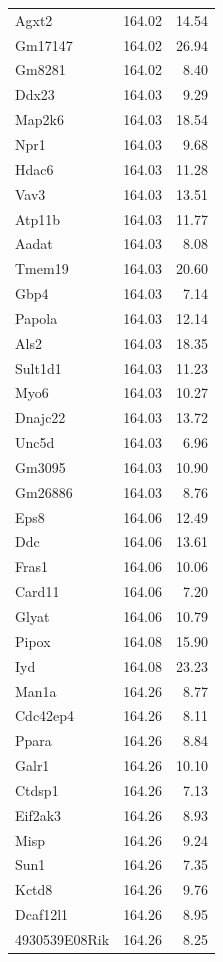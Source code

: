 \documentclass{article}
\begin{document}
\begin{longtable}{lrr}
  Agxt2 & 164.02 & 14.54 \\ 
  Gm17147 & 164.02 & 26.94 \\ 
  Gm8281 & 164.02 & 8.40 \\ 
  Ddx23 & 164.03 & 9.29 \\ 
  Map2k6 & 164.03 & 18.54 \\ 
  Npr1 & 164.03 & 9.68 \\ 
  Hdac6 & 164.03 & 11.28 \\ 
  Vav3 & 164.03 & 13.51 \\ 
  Atp11b & 164.03 & 11.77 \\ 
  Aadat & 164.03 & 8.08 \\ 
  Tmem19 & 164.03 & 20.60 \\ 
  Gbp4 & 164.03 & 7.14 \\ 
  Papola & 164.03 & 12.14 \\ 
  Als2 & 164.03 & 18.35 \\ 
  Sult1d1 & 164.03 & 11.23 \\ 
  Myo6 & 164.03 & 10.27 \\ 
  Dnajc22 & 164.03 & 13.72 \\ 
  Unc5d & 164.03 & 6.96 \\ 
  Gm3095 & 164.03 & 10.90 \\ 
  Gm26886 & 164.03 & 8.76 \\ 
  Eps8 & 164.06 & 12.49 \\ 
  Ddc & 164.06 & 13.61 \\ 
  Fras1 & 164.06 & 10.06 \\ 
  Card11 & 164.06 & 7.20 \\ 
  Glyat & 164.06 & 10.79 \\ 
  Pipox & 164.08 & 15.90 \\ 
  Iyd & 164.08 & 23.23 \\ 
  Man1a & 164.26 & 8.77 \\ 
  Cdc42ep4 & 164.26 & 8.11 \\ 
  Ppara & 164.26 & 8.84 \\ 
  Galr1 & 164.26 & 10.10 \\ 
  Ctdsp1 & 164.26 & 7.13 \\ 
  Eif2ak3 & 164.26 & 8.93 \\ 
  Misp & 164.26 & 9.24 \\ 
  Sun1 & 164.26 & 7.35 \\ 
  Kctd8 & 164.26 & 9.76 \\ 
  Dcaf12l1 & 164.26 & 8.95 \\ 
  4930539E08Rik & 164.26 & 8.25 \\ 

\end{longtable}
\end{document}
